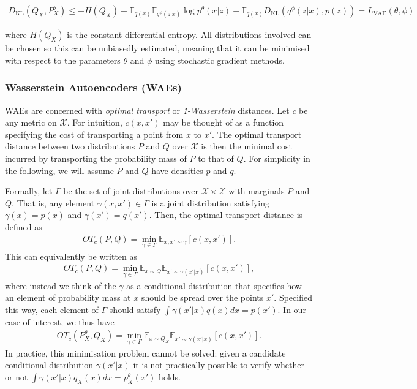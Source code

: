 \begin{align*}
D_{\text{KL}}(Q_X, P^\theta_X) \leq -H(Q_X)  - \mathbb{E}_{q(x)} \mathbb{E}_{q^\phi(z|x)} \log p^\theta(x|z) + \mathbb{E}_{q(x)}D_{\text{KL}}\left(q^\phi(z|x), p(z)\right) = L_{\text{VAE}}(\theta, \phi)
\end{align*}

where $H(Q_X)$ is the constant differential entropy.
All distributions involved can be chosen so this can be unbiasedly estimated, meaning that it can be minimised with respect to the parameters $\theta$ and $\phi$ using stochastic gradient methods.


\subsubsection{Wasserstein Autoencoders (WAEs)}

WAEs \citep{tolstikhin et al} are concerned with \emph{optimal transport} or \emph{1-Wasserstein} distances.
Let $c$ be any metric on $\mathcal{X}$.
For intuition, $c(x, x')$ may be thought of as a function specifying the cost of transporting a point from $x$ to $x'$.
The optimal transport distance between two distributions $P$ and $Q$ over $\mathcal{X}$ is then the minimal cost incurred by transporting the probability mass of $P$ to that of $Q$.
For simplicity in the following, we will assume $P$ and $Q$ have densities $p$ and $q$. 

Formally, let $\Gamma$ be the set of joint distributions over $\mathcal{X} \times \mathcal{X}$ with marginals $P$ and $Q$. 
That is, any element $\gamma(x, x') \in \Gamma$ is a joint distribution satisfying $\gamma(x) = p(x)$ and $\gamma(x') = q(x')$.
Then, the optimal transport distance is defined as
%
\begin{align*}
OT_c(P, Q) = \min_{\gamma \in \Gamma} \mathbb{E}_{x, x' \sim \gamma} \left[ c(x, x') \right].
\end{align*}
%
This can equivalently be written as
%
\begin{align*}
OT_c(P, Q) = \min_{\gamma \in \Gamma} \mathbb{E}_{x\sim Q} \mathbb{E}_{x'\sim \gamma(x'|x)} \left[ c(x, x') \right],
\end{align*}
%
where instead we think of the $\gamma$ as a conditional distribution that specifies how an element of probability mass at $x$ should be spread over the points $x'$. 
Specified this way, each element of $\Gamma$ should satisfy $\int \gamma(x'|x) q(x) dx = p(x')$.
In our case of interest, we thus have
%
\begin{align*}
OT_c(P_X^\theta, Q_X) = \min_{\gamma \in \Gamma} \mathbb{E}_{x\sim Q_X} \mathbb{E}_{x'\sim \gamma(x'|x)} \left[ c(x, x') \right].
\end{align*}
%
In practice, this minimisation problem cannot be solved: given a candidate conditional distribution $\gamma(x'|x)$ it is not practically possible to verify whether or not $\int \gamma(x'|x) q_X(x) dx = p_X^\theta(x')$ holds.

